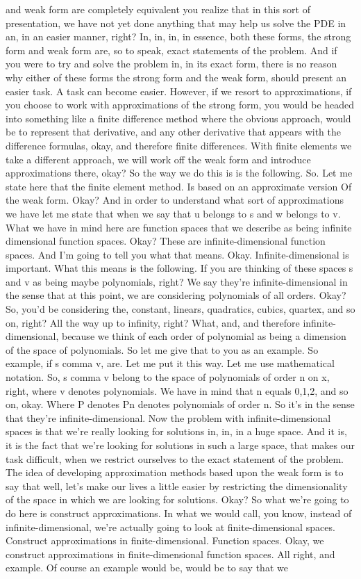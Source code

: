 \documentclass[10pt]{article}
\begin{document}
and weak form are completely equivalent you realize that in this sort of presentation, we have not yet done anything that may help us solve the PDE in an, in an easier manner, right? In, in, in, in essence, both these forms, the strong form and weak form are, so to speak, exact statements of the problem. And if you were to try and solve the problem in, in its exact form, there is no reason why either of these forms the strong form and the weak form, should present an easier task. A task can become easier. However, if we resort to approximations, if you choose to work with approximations of the strong form, you would be headed into something like a finite difference method where the obvious approach, would be to represent that derivative, and any other derivative that appears with the difference formulas, okay, and therefore finite differences. With finite elements we take a different approach, we will work off the weak form and introduce approximations there, okay? So the way we do this is is the following. So. Let me state here that the finite element method. Is based on an approximate version Of the weak form. Okay? And in order to understand what sort of approximations we have let me state that when we say that u belongs to s and w belongs to v. What we have in mind here are function spaces that we describe as being infinite dimensional function spaces. Okay? These are infinite-dimensional function spaces. And I'm going to tell you what that means. Okay. Infinite-dimensional is important. What this means is the following. If you are thinking of these spaces s and v as being maybe polynomials, right? We say they're infinite-dimensional in the sense that at this point, we are considering polynomials of all orders. Okay? So, you'd be considering the, constant, linears, quadratics, cubics, quartex, and so on, right? All the way up to infinity, right? What, and, and therefore infinite-dimensional, because we think of each order of polynomial as being a dimension of the space of polynomials. So let me give that to you as an example. So example, if s comma v, are. Let me put it this way. Let me use mathematical notation. So, s comma v belong to the space of polynomials of order n on x, right, where v denotes polynomials. We have in mind that n equals 0,1,2, and so on, okay. Where P denotes Pn denotes polynomials of order n. So it's in the sense that they're infinite-dimensional. Now the problem with infinite-dimensional spaces is that we're really looking for solutions in, in, in a huge space. And it is, it is the fact that we're looking for solutions in such a large space, that makes our task difficult, when we restrict ourselves to the exact statement of the problem. The idea of developing approximation methods based upon the weak form is to say that well, let's make our lives a little easier by restricting the dimensionality of the space in which we are looking for solutions. Okay? So what we're going to do here is construct approximations. In what we would call, you know, instead of infinite-dimensional, we're actually going to look at finite-dimensional spaces. Construct approximations in finite-dimensional. Function spaces. Okay, we construct approximations in finite-dimensional function spaces. All right, and example. Of course an example would be, would be to say that we 
\end{document}
